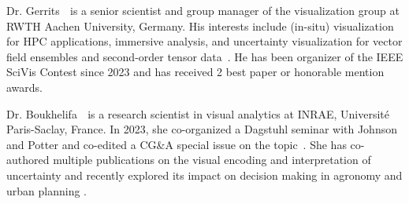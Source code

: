 {\large Dr. Gerrits} $\;$ is a senior scientist and group manager of the visualization group at RWTH Aachen University, Germany. His interests include (in-situ) visualization for HPC applications, immersive analysis, and uncertainty visualization for vector field ensembles and second-order tensor data~\cite{Gerrits:2019:EuroVis, schmitz24exploring}. He has been organizer of the IEEE SciVis Contest since 2023 and has received 2 best paper or honorable mention awards.

{\large Dr. Boukhelifa} $\;$ is a research scientist in visual analytics at INRAE, Université Paris-Saclay, France. In 2023, she co-organized a Dagstuhl seminar with Johnson and Potter and co-edited a CG\&A special issue on the topic~\cite{boukhelifa_et_al:DagRep.12.8.1,boukhelifa2023visualization,wood2012sketchy}. She has co-authored multiple publications on the visual encoding and interpretation of uncertainty \cite{boukhelifa2023visualization,boukhelifa2012evaluating,boukhelifa2017data,boukhelifa2009uncertainty} and recently explored its impact on decision making in agronomy and urban planning \cite{courteille2024using}.
